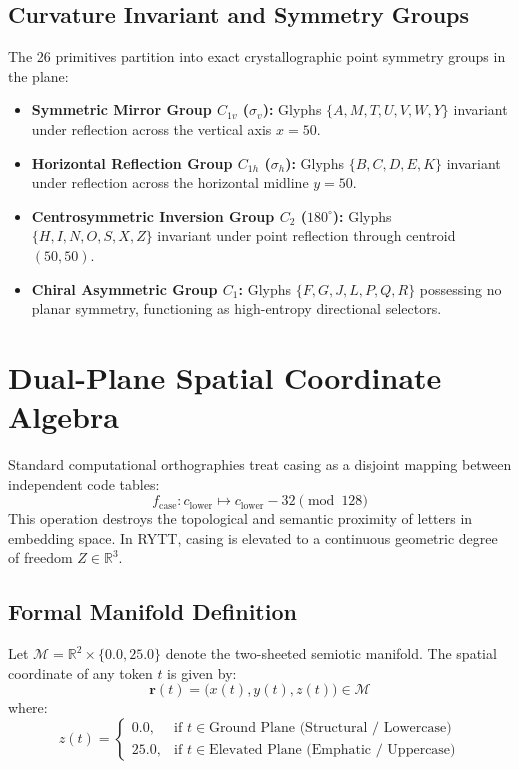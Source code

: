 \documentclass[11pt,oneside,letterpaper]{article}
\theoremstyle{definition}
\begin{document}
\subsection{Curvature Invariant and Symmetry Groups}
The 26 primitives partition into exact crystallographic point symmetry groups in the plane:
\begin{itemize}
  \item \textbf{Symmetric Mirror Group $C_{1v}$ ($\sigma_v$):} Glyphs $\{A, M, T, U, V, W, Y\}$ invariant under reflection across the vertical axis $x = 50$.
  \item \textbf{Horizontal Reflection Group $C_{1h}$ ($\sigma_h$):} Glyphs $\{B, C, D, E, K\}$ invariant under reflection across the horizontal midline $y = 50$.
  \item \textbf{Centrosymmetric Inversion Group $C_2$ ($180^\circ$):} Glyphs $\{H, I, N, O, S, X, Z\}$ invariant under point reflection through centroid $(50, 50)$.
  \item \textbf{Chiral Asymmetric Group $C_1$:} Glyphs $\{F, G, J, L, P, Q, R\}$ possessing no planar symmetry, functioning as high-entropy directional selectors.
\end{itemize}

\section{Dual-Plane Spatial Coordinate Algebra}

Standard computational orthographies treat casing as a disjoint mapping between independent code tables:
\begin{equation}
f_{\text{case}}: c_{\text{lower}} \mapsto c_{\text{lower}} - 32 \pmod{128}
\end{equation}
This operation destroys the topological and semantic proximity of letters in embedding space. In RYTT, casing is elevated to a continuous geometric degree of freedom $Z \in \mathbb{R}^3$.

\subsection{Formal Manifold Definition}
\begin{definition}
Let $\mathcal{M} = \mathbb{R}^2 \times \{0.0, 25.0\}$ denote the two-sheeted semiotic manifold. The spatial coordinate of any token $t$ is given by:
\begin{equation}
\mathbf{r}(t) = \big(x(t), y(t), z(t)\big) \in \mathcal{M}
\end{equation}
where:
\begin{equation}
z(t) = \begin{cases}
0.0, & \text{if } t \in \text{Ground Plane (Structural / Lowercase)} \\
25.0, & \text{if } t \in \text{Elevated Plane (Emphatic / Uppercase)}
\end{cases}
\end{equation}
\end{definition}
\end{document}
